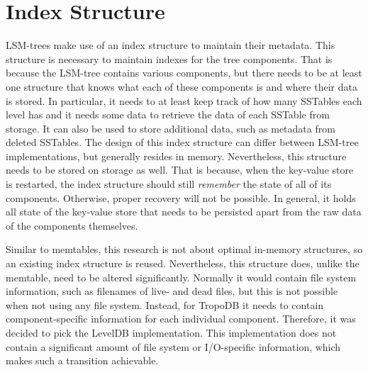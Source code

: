\section{Index Structure}
\label{sec:index}
LSM-trees make use of an index structure to maintain their metadata. This structure is necessary to maintain indexes for the tree components. That is because the LSM-tree contains various components, but there needs to be at least one structure that knows what each of these components is and where their data is stored. In particular, it needs to at least keep track of how many SSTables each level has and it needs some data to retrieve the data of each SSTable from storage. It can also be used to store additional data, such as metadata from deleted SSTables. The design of this index structure can differ between LSM-tree implementations, but generally resides in memory. Nevertheless, this structure needs to be stored on storage as well. That is because, when the key-value store is restarted, the index structure should still \textit{remember} the state of all of its components. Otherwise, proper recovery will not be possible. In general, it holds all state of the key-value store that needs to be persisted apart from the raw data of the components themselves.

Similar to memtables, this research is not about optimal in-memory structures, so an existing index structure is reused. Nevertheless, this structure does, unlike the memtable, need to be altered significantly. Normally it would contain file system information, such as filenames of live- and dead files, but this is not possible when not using any file system. Instead, for TropoDB it needs to contain component-specific information for each individual component. Therefore, it was decided to pick the LevelDB implementation. This implementation does not contain a significant amount of file system or I/O-specific information, which makes such a transition achievable. 

